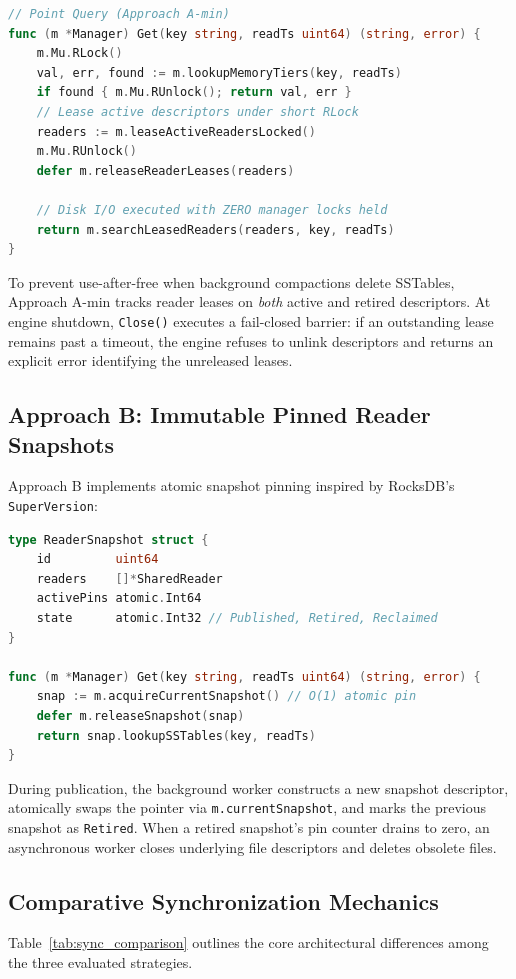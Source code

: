 \documentclass[conference]{IEEEtran}
\begin{document}
\begin{lstlisting}[language=Go, caption={Approach A-min reader leasing and publication}]
// Point Query (Approach A-min)
func (m *Manager) Get(key string, readTs uint64) (string, error) {
    m.Mu.RLock()
    val, err, found := m.lookupMemoryTiers(key, readTs)
    if found { m.Mu.RUnlock(); return val, err }
    // Lease active descriptors under short RLock
    readers := m.leaseActiveReadersLocked()
    m.Mu.RUnlock()
    defer m.releaseReaderLeases(readers)

    // Disk I/O executed with ZERO manager locks held
    return m.searchLeasedReaders(readers, key, readTs)
}
\end{lstlisting}

To prevent use-after-free when background compactions delete SSTables, Approach A-min tracks reader leases on \emph{both} active and retired descriptors. At engine shutdown, \texttt{Close()} executes a fail-closed barrier: if an outstanding lease remains past a timeout, the engine refuses to unlink descriptors and returns an explicit error identifying the unreleased leases.

\subsection{Approach B: Immutable Pinned Reader Snapshots}
Approach B implements atomic snapshot pinning inspired by RocksDB's \texttt{SuperVersion}:

\begin{lstlisting}[language=Go, caption={Approach B reader snapshot pinning}]
type ReaderSnapshot struct {
    id         uint64
    readers    []*SharedReader
    activePins atomic.Int64
    state      atomic.Int32 // Published, Retired, Reclaimed
}

func (m *Manager) Get(key string, readTs uint64) (string, error) {
    snap := m.acquireCurrentSnapshot() // O(1) atomic pin
    defer m.releaseSnapshot(snap)
    return snap.lookupSSTables(key, readTs)
}
\end{lstlisting}

During publication, the background worker constructs a new snapshot descriptor, atomically swaps the pointer via \texttt{m.currentSnapshot}, and marks the previous snapshot as \texttt{Retired}. When a retired snapshot's pin counter drains to zero, an asynchronous worker closes underlying file descriptors and deletes obsolete files.

\subsection{Comparative Synchronization Mechanics}
Table~\ref{tab:sync_comparison} outlines the core architectural differences among the three evaluated strategies.
\end{document}
